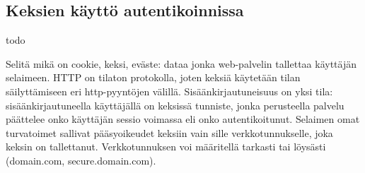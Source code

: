 \documentclass[finnish,gradu]{tktltiki}
\begin{document}



\subsection{Keksien käyttö autentikoinnissa} %
\label{ssub:keksien_käyttö_autentikoinnissa}

todo

Selitä mikä on cookie, keksi, eväste: dataa jonka web-palvelin tallettaa käyttäjän selaimeen. HTTP on tilaton protokolla, joten keksiä käytetään tilan säilyttämiseen eri http-pyyntöjen välillä. Sisäänkirjautuneisuus on yksi tila: sisäänkirjautuneella käyttäjällä on keksissä tunniste, jonka perusteella palvelu päättelee onko käyttäjän sessio voimassa eli onko autentikoitunut.
 Selaimen omat turvatoimet sallivat pääsyoikeudet keksiin vain sille verkkotunnukselle, joka keksin on tallettanut. Verkkotunnuksen voi määritellä tarkasti tai löysästi (domain.com, secure.domain.com).
\end{document}
